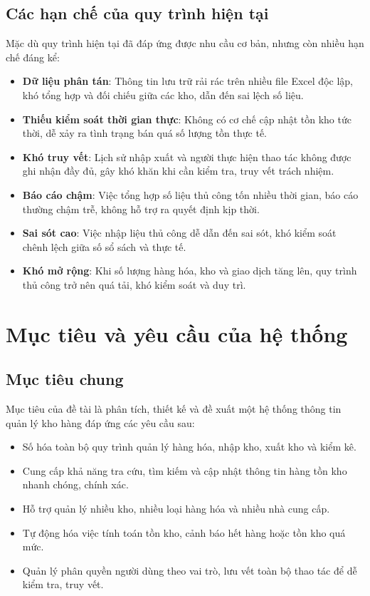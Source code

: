 \subsection{Các hạn chế của quy trình hiện tại}

Mặc dù quy trình hiện tại đã đáp ứng được nhu cầu cơ bản, nhưng còn nhiều hạn chế đáng kể:

\begin{itemize}[leftmargin=1.5cm]
    \item \textbf{Dữ liệu phân tán}: Thông tin lưu trữ rải rác trên nhiều file Excel độc lập, khó tổng hợp và đối chiếu giữa các kho, dẫn đến sai lệch số liệu.
    \item \textbf{Thiếu kiểm soát thời gian thực}: Không có cơ chế cập nhật tồn kho tức thời, dễ xảy ra tình trạng bán quá số lượng tồn thực tế.
    \item \textbf{Khó truy vết}: Lịch sử nhập xuất và người thực hiện thao tác không được ghi nhận đầy đủ, gây khó khăn khi cần kiểm tra, truy vết trách nhiệm.
    \item \textbf{Báo cáo chậm}: Việc tổng hợp số liệu thủ công tốn nhiều thời gian, báo cáo thường chậm trễ, không hỗ trợ ra quyết định kịp thời.
    \item \textbf{Sai sót cao}: Việc nhập liệu thủ công dễ dẫn đến sai sót, khó kiểm soát chênh lệch giữa số sổ sách và thực tế.
    \item \textbf{Khó mở rộng}: Khi số lượng hàng hóa, kho và giao dịch tăng lên, quy trình thủ công trở nên quá tải, khó kiểm soát và duy trì.
\end{itemize}

\section{Mục tiêu và yêu cầu của hệ thống}

\subsection{Mục tiêu chung}

Mục tiêu của đề tài là phân tích, thiết kế và đề xuất một hệ thống thông tin quản lý kho hàng đáp ứng các yêu cầu sau:

\begin{itemize}[leftmargin=1.5cm]
    \item Số hóa toàn bộ quy trình quản lý hàng hóa, nhập kho, xuất kho và kiểm kê.
    \item Cung cấp khả năng tra cứu, tìm kiếm và cập nhật thông tin hàng tồn kho nhanh chóng, chính xác.
    \item Hỗ trợ quản lý nhiều kho, nhiều loại hàng hóa và nhiều nhà cung cấp.
    \item Tự động hóa việc tính toán tồn kho, cảnh báo hết hàng hoặc tồn kho quá mức.
    \item Quản lý phân quyền người dùng theo vai trò, lưu vết toàn bộ thao tác để dễ kiểm tra, truy vết.
\end{itemize}

